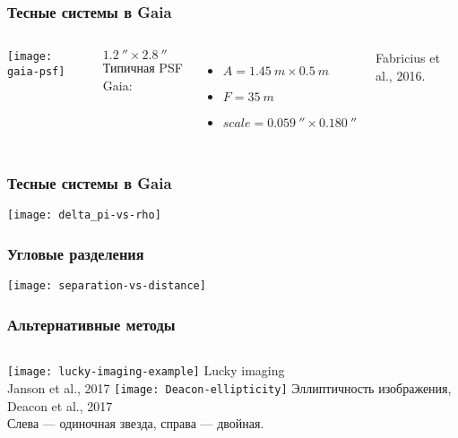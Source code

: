 \begin{frame}
\frametitle{Тесные системы в Gaia}
\begin{columns}
\texttt{[image: gaia-psf]}
{\footnotesize $1.2~'' \times 2.8~''$ \\

Типичная PSF Gaia:
 \begin{itemize}
    \item $A=1.45~m\times0.5~m$ 
    \item $F= 35~m$ 
    \item $scale=0.059~'' \times 0.180~''$ 
 \end{itemize}
Fabricius et al., 2016.}
\end{columns}
\end{frame}



\begin{frame}
\frametitle{Тесные системы в Gaia}
\begin{center}
\texttt{[image: delta\_pi-vs-rho]}
\end{center}
\end{frame}


\begin{frame}
\frametitle{Угловые разделения}
\begin{center}
\texttt{[image: separation-vs-distance]}
\end{center}
\end{frame}



\begin{frame}%
\frametitle{Альтернативные методы}
\begin{columns}
	\texttt{[image: lucky-imaging-example]}
	{\footnotesize Lucky imaging\\ Janson et al., 2017}
	\texttt{[image: Deacon-ellipticity]}
    {\footnotesize Эллиптичность изображения, Deacon et al., 2017\\ 
    Слева --- одиночная звезда, справа --- двойная.}
\end{columns}
\end{frame}



